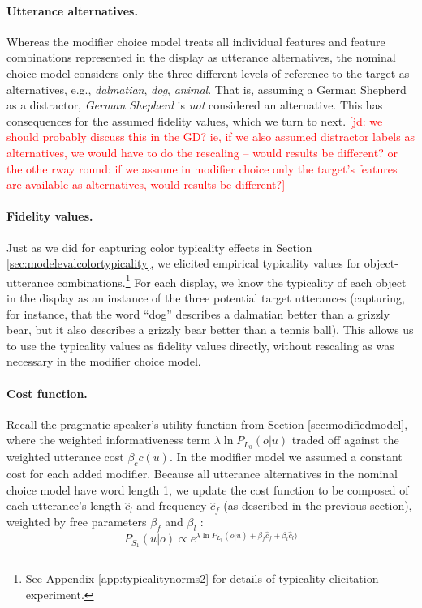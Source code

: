 \documentclass[11pt]{article}
\newcommand{\jd}[1]{\textcolor{Red}{[jd: #1]}}
\newcommand{\appref}[1]{Appendix \ref{#1}}
\newcommand{\sectionref}[1]{Section \ref{#1}}
\begin{document}
\paragraph{Utterance alternatives.} Whereas the modifier choice model treats all individual features and feature combinations represented in the display as utterance alternatives, the nominal choice model considers only the three different levels of reference to the target as alternatives, e.g., \emph{dalmatian}, \emph{dog}, \emph{animal}. That is, assuming a German Shepherd as a distractor, \emph{German Shepherd} is \emph{not} considered an alternative. This has consequences for the assumed fidelity values, which we turn to next. \jd{we should probably discuss this in the GD? ie, if we also assumed distractor labels as alternatives, we would have to do the rescaling -- would results be different? or the othe rway round: if we assume in modifier choice only the target's features are available as alternatives, would results be different?}

\paragraph{Fidelity values.} Just as we did for capturing color typicality effects in \sectionref{sec:modelevalcolortypicality}, we elicited empirical typicality values for object-utterance combinations.\footnote{See \appref{app:typicalitynorms2} for details of typicality elicitation experiment.} For each display, we know the typicality of each object in the display as an instance of the three potential target utterances (capturing, for instance, that the word ``dog'' describes a dalmatian better than a grizzly bear, but it also describes a grizzly bear better than a tennis ball). This allows us to use the typicality values as fidelity values directly, without rescaling as was necessary in the modifier choice model.

\paragraph{Cost function.} Recall the pragmatic speaker's utility function from \sectionref{sec:modifiedmodel}, where the weighted informativeness term $\lambda \ln P_{L_0}(o | u)$ traded off against the weighted utterance cost $\beta_c c(u)$. In the modifier model we assumed a constant cost for each added modifier. Because all utterance alternatives in the nominal choice model have word length 1, we update the cost function to be composed of each utterance's length $\hat{c}_l$ and frequency $\hat{c}_f$ (as described in the previous section), weighted by free parameters $\beta_f$ and $\beta_l$ :
\begin{equation}
P_{S_1}(u | o) \propto e^{\lambda \ln P_{L_0}(o | u) + \beta_f \hat{c}_f  + \beta_l \hat{c}_l)}
\end{equation}
\end{document}

